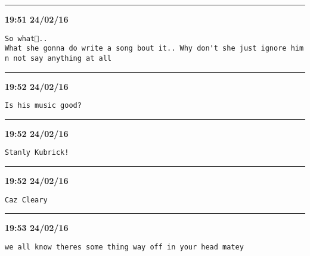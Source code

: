 \hrule%

\begin{adjustwidth}{0cm}{0cm}
\footnotesize \textbf{19:51 24/02/16}

\begin{lstlisting}[breaklines, breakatwhitespace, basicstyle=\small, frame=leftline]
So what💁.. 
What she gonna do write a song bout it.. Why don't she just ignore him n not say anything at all
\end{lstlisting}
\end{adjustwidth}

\hrule%

\begin{adjustwidth}{0cm}{0cm}
\footnotesize \textbf{19:52 24/02/16}

\begin{lstlisting}[breaklines, breakatwhitespace, basicstyle=\small, frame=leftline]
Is his music good?
\end{lstlisting}
\end{adjustwidth}

\hrule%

\begin{adjustwidth}{0cm}{0cm}
\footnotesize \textbf{19:52 24/02/16}

\begin{lstlisting}[breaklines, breakatwhitespace, basicstyle=\small, frame=leftline]
Stanly Kubrick!
\end{lstlisting}
\end{adjustwidth}

\hrule%

\begin{adjustwidth}{0cm}{0cm}
\footnotesize \textbf{19:52 24/02/16}

\begin{lstlisting}[breaklines, breakatwhitespace, basicstyle=\small, frame=leftline]
Caz Cleary
\end{lstlisting}
\end{adjustwidth}

\hrule%

\begin{adjustwidth}{0cm}{0cm}
\footnotesize \textbf{19:53 24/02/16}

\begin{lstlisting}[breaklines, breakatwhitespace, basicstyle=\small, frame=leftline]
we all know theres some thing way off in your head matey
\end{lstlisting}
\end{adjustwidth}

